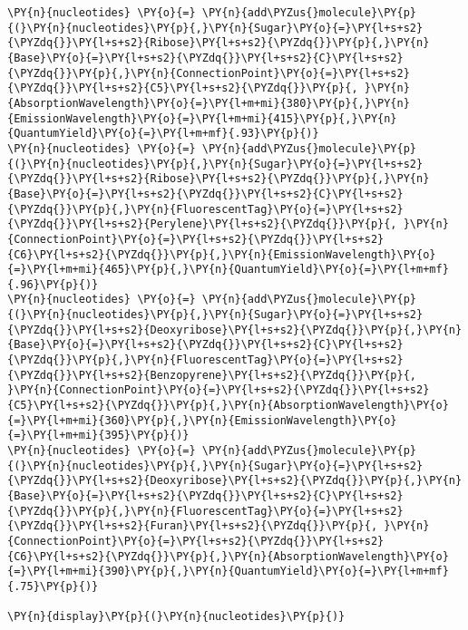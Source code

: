     \begin{tcolorbox}[breakable, size=fbox, boxrule=1pt, pad at break*=1mm,colback=cellbackground, colframe=cellborder]
\begin{Verbatim}[commandchars=\\\{\}]
\PY{n}{nucleotides} \PY{o}{=} \PY{n}{add\PYZus{}molecule}\PY{p}{(}\PY{n}{nucleotides}\PY{p}{,}\PY{n}{Sugar}\PY{o}{=}\PY{l+s+s2}{\PYZdq{}}\PY{l+s+s2}{Ribose}\PY{l+s+s2}{\PYZdq{}}\PY{p}{,}\PY{n}{Base}\PY{o}{=}\PY{l+s+s2}{\PYZdq{}}\PY{l+s+s2}{C}\PY{l+s+s2}{\PYZdq{}}\PY{p}{,}\PY{n}{ConnectionPoint}\PY{o}{=}\PY{l+s+s2}{\PYZdq{}}\PY{l+s+s2}{C5}\PY{l+s+s2}{\PYZdq{}}\PY{p}{, }\PY{n}{AbsorptionWavelength}\PY{o}{=}\PY{l+m+mi}{380}\PY{p}{,}\PY{n}{EmissionWavelength}\PY{o}{=}\PY{l+m+mi}{415}\PY{p}{,}\PY{n}{QuantumYield}\PY{o}{=}\PY{l+m+mf}{.93}\PY{p}{)}
\PY{n}{nucleotides} \PY{o}{=} \PY{n}{add\PYZus{}molecule}\PY{p}{(}\PY{n}{nucleotides}\PY{p}{,}\PY{n}{Sugar}\PY{o}{=}\PY{l+s+s2}{\PYZdq{}}\PY{l+s+s2}{Ribose}\PY{l+s+s2}{\PYZdq{}}\PY{p}{,}\PY{n}{Base}\PY{o}{=}\PY{l+s+s2}{\PYZdq{}}\PY{l+s+s2}{C}\PY{l+s+s2}{\PYZdq{}}\PY{p}{,}\PY{n}{FluorescentTag}\PY{o}{=}\PY{l+s+s2}{\PYZdq{}}\PY{l+s+s2}{Perylene}\PY{l+s+s2}{\PYZdq{}}\PY{p}{, }\PY{n}{ConnectionPoint}\PY{o}{=}\PY{l+s+s2}{\PYZdq{}}\PY{l+s+s2}{C6}\PY{l+s+s2}{\PYZdq{}}\PY{p}{,}\PY{n}{EmissionWavelength}\PY{o}{=}\PY{l+m+mi}{465}\PY{p}{,}\PY{n}{QuantumYield}\PY{o}{=}\PY{l+m+mf}{.96}\PY{p}{)}
\PY{n}{nucleotides} \PY{o}{=} \PY{n}{add\PYZus{}molecule}\PY{p}{(}\PY{n}{nucleotides}\PY{p}{,}\PY{n}{Sugar}\PY{o}{=}\PY{l+s+s2}{\PYZdq{}}\PY{l+s+s2}{Deoxyribose}\PY{l+s+s2}{\PYZdq{}}\PY{p}{,}\PY{n}{Base}\PY{o}{=}\PY{l+s+s2}{\PYZdq{}}\PY{l+s+s2}{C}\PY{l+s+s2}{\PYZdq{}}\PY{p}{,}\PY{n}{FluorescentTag}\PY{o}{=}\PY{l+s+s2}{\PYZdq{}}\PY{l+s+s2}{Benzopyrene}\PY{l+s+s2}{\PYZdq{}}\PY{p}{, }\PY{n}{ConnectionPoint}\PY{o}{=}\PY{l+s+s2}{\PYZdq{}}\PY{l+s+s2}{C5}\PY{l+s+s2}{\PYZdq{}}\PY{p}{,}\PY{n}{AbsorptionWavelength}\PY{o}{=}\PY{l+m+mi}{360}\PY{p}{,}\PY{n}{EmissionWavelength}\PY{o}{=}\PY{l+m+mi}{395}\PY{p}{)}
\PY{n}{nucleotides} \PY{o}{=} \PY{n}{add\PYZus{}molecule}\PY{p}{(}\PY{n}{nucleotides}\PY{p}{,}\PY{n}{Sugar}\PY{o}{=}\PY{l+s+s2}{\PYZdq{}}\PY{l+s+s2}{Deoxyribose}\PY{l+s+s2}{\PYZdq{}}\PY{p}{,}\PY{n}{Base}\PY{o}{=}\PY{l+s+s2}{\PYZdq{}}\PY{l+s+s2}{C}\PY{l+s+s2}{\PYZdq{}}\PY{p}{,}\PY{n}{FluorescentTag}\PY{o}{=}\PY{l+s+s2}{\PYZdq{}}\PY{l+s+s2}{Furan}\PY{l+s+s2}{\PYZdq{}}\PY{p}{, }\PY{n}{ConnectionPoint}\PY{o}{=}\PY{l+s+s2}{\PYZdq{}}\PY{l+s+s2}{C6}\PY{l+s+s2}{\PYZdq{}}\PY{p}{,}\PY{n}{AbsorptionWavelength}\PY{o}{=}\PY{l+m+mi}{390}\PY{p}{,}\PY{n}{QuantumYield}\PY{o}{=}\PY{l+m+mf}{.75}\PY{p}{)}

\PY{n}{display}\PY{p}{(}\PY{n}{nucleotides}\PY{p}{)}
\end{Verbatim}
\end{tcolorbox}

